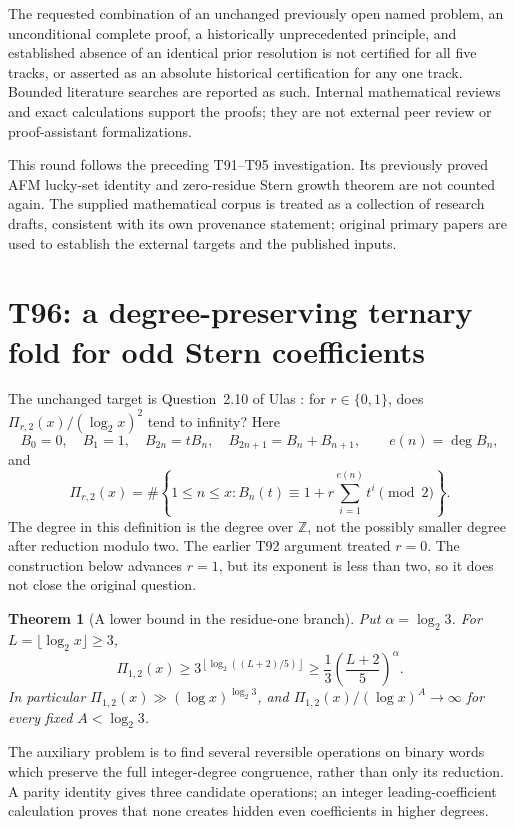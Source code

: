 \documentclass[11pt,a4paper]{article}
\newtheorem{theorem}{Theorem}[section]
\theoremstyle{definition}
\theoremstyle{remark}
\begin{document}
The requested combination of an unchanged previously open named problem,
an unconditional complete proof, a historically unprecedented principle,
and established absence of an identical prior resolution is not certified
for all five tracks, or asserted as an absolute historical certification
for any one track. Bounded literature searches are reported as such.
Internal mathematical reviews and exact calculations support the proofs;
they are not external peer review or proof-assistant formalizations.

This round follows the preceding T91--T95 investigation. Its previously
proved AFM lucky-set identity and zero-residue Stern growth theorem are
not counted again. The supplied mathematical corpus is treated as a
collection of research drafts, consistent with its own provenance
statement; original primary papers are used to establish the external
targets and the published inputs.


\clearpage
\section{T96: a degree-preserving ternary fold for odd Stern coefficients}
\label{sec:t96}

The unchanged target is Question~2.10 of Ulas
\cite{t96:ulas}: for $r\in\{0,1\}$, does
$\Pi_{r,2}(x)/(\log_2x)^2$ tend to infinity? Here
\[
 B_0=0,\quad B_1=1,\quad B_{2n}=tB_n,\quad
 B_{2n+1}=B_n+B_{n+1},\qquad e(n)=\deg B_n,
\]
and
\[
 \Pi_{r,2}(x)=\#\left\{1\le n\le x:
 B_n(t)\equiv1+r\sum_{i=1}^{e(n)}t^i\pmod2\right\}.
\]
The degree in this definition is the degree over $\mathbb Z$, not the
possibly smaller degree after reduction modulo two. The earlier T92
argument treated $r=0$. The construction below advances $r=1$, but its
exponent is less than two, so it does not close the original question.

\begin{theorem}[A lower bound in the residue-one branch]
Put $\alpha=\log_2 3$. For $L=\lfloor\log_2x\rfloor\ge3$,
\[
 \Pi_{1,2}(x)\ge
 3^{\left\lfloor\log_2((L+2)/5)\right\rfloor}
 \ge \frac13\left(\frac{L+2}{5}\right)^\alpha.
\]
In particular $\Pi_{1,2}(x)\gg(\log x)^{\log_2 3}$, and
$\Pi_{1,2}(x)/(\log x)^A\to\infty$ for every fixed
$A<\log_2 3$.
\end{theorem}

The auxiliary problem is to find several reversible operations on binary
words which preserve the full integer-degree congruence, rather than
only its reduction. A parity identity gives three candidate operations;
an integer leading-coefficient calculation proves that none creates
hidden even coefficients in higher degrees.
\end{document}
